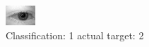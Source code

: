\begin{figure}[h!]
\begin{center}
\includegraphics[width=0.60\columnwidth]{figures/ID486_class_1_target_2.png}
\end{center}
\caption{ Classification: 1 actual target: 2}
\label{fig:ID486_class_1_target_2}
\end{figure}
